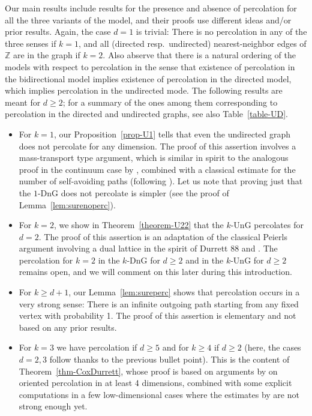 \documentclass{article}
\theoremstyle{definition}
\newcommand{\1}{\mathbbm{1}}
\newcommand{\0}{\mathbf{o}}
\newcommand{\Z}{\mathbb{Z}}
\begin{document}
Our main results include results for the presence and absence of percolation for all the three variants of the model, and their proofs use different ideas and/or prior results. Again, the case $d=1$ is trivial: There is no percolation in any of the three senses if $k=1$, and all (directed resp.\ undirected) nearest-neighbor edges of $\Z$ are in the graph if $k=2$. Also abserve that there is a natural ordering of the models with respect to percolation in the sense that existence of percolation in the bidirectional model implies existence of percolation in the directed model, which implies percolation in the undirected mode. The following results are meant for $d \geq 2$; for a summary of the ones among them corresponding to percolation in the directed and undirected graphs, see also Table~\ref{table-UD}. 
\begin{itemize}
    \item For $k=1$, our Proposition~\ref{prop-U1} tells that even the undirected graph does not percolate for any dimension. The proof of this assertion involves a mass-transport type argument, which is similar in spirit to the analogous proof in the continuum case by \cite{HaggMee96}, combined with a classical estimate for the number of self-avoiding paths (following \cite{Grimmett1999}). Let us note that proving just that the $1$-DnG does not percolate is simpler (see the proof of Lemma~\ref{lem:surenoperc}).
    \item For $k=2$, we show in Theorem~\ref{theorem-U22} that the $k$-UnG percolates for $d=2$. The proof of this assertion is an adaptation of the classical Peierls argument involving a dual lattice in the spirit of \color{red} Durrett 88 and \cite{JanSwart} \color{black}. The percolation for $k=2$ in the $k$-DnG for $d \geq 2$ and in the $k$-UnG for $d \geq 2$ remains open, and we will comment on this later during this introduction.
    \item For $k \geq d+1$, our Lemma~\ref{lem:sureperc} shows that percolation occurs in a very strong sense: There is an infinite outgoing path starting from any fixed vertex with probability 1. The proof of this assertion is elementary and not based on any prior results.
    \item For $k=3$ we have percolation if $d \geq 5$ and for $k \geq 4$ if $d \geq 2$ (here, the cases $d=2,3$ follow thanks to the previous bullet point). This is the content of Theorem~\ref{thm-CoxDurrett}, whose proof is based on arguments by \cite{CoxDurrett} on oriented percolation in at least 4 dimensions, combined with some explicit computations in a few low-dimensional cases where the estimates by \cite{CoxDurrett} are not strong enough yet.

\end{itemize}
\end{document}
